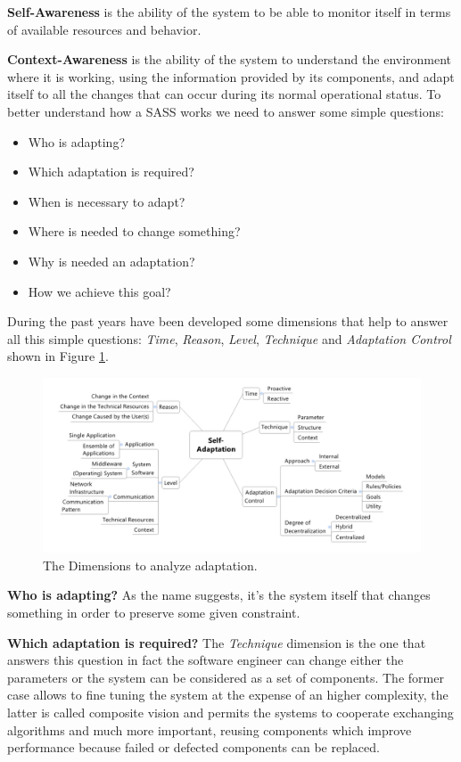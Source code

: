 \textbf{Self-Awareness} is the ability of the system to be able to monitor itself in terms of available resources and behavior.

\textbf{Context-Awareness} is the ability of the system to understand the environment where it is working, using the information provided by its components, and adapt itself to all the changes that can occur during its normal operational status.
To better understand how a SASS works we need to answer some simple questions:
\begin{itemize}
	\item Who is adapting?
	\item Which adaptation is required?
	\item When is necessary to adapt?
	\item Where is needed to change something?
	\item Why is needed an adaptation?
	\item How we achieve this goal?
\end{itemize}

During the past years have been developed some dimensions that help to answer all this simple questions: \emph{Time}, \emph{Reason}, \emph{Level}, \emph{Technique} and \emph{Adaptation Control} shown in Figure \ref{fig:dimensions}.
\begin{figure}[ht]
	\centerline
	{\includegraphics[scale=0.50]{img/dimensions.png}}
	\caption[The Dimensions]{The Dimensions to analyze adaptation.\cite{eng-appr-sas}}
	\label{fig:dimensions}
\end{figure}

\textbf{Who is adapting?} As the name suggests, it's the system itself that changes something in order to preserve some given constraint.

\textbf{Which adaptation is required?} The \emph{Technique} dimension is the one that answers this question in fact the software engineer can change either the parameters or the system can be considered as a set of components. The former case allows to fine tuning the system at the expense of an higher complexity, the latter is called composite vision and permits the systems to cooperate exchanging algorithms and much more important, reusing components which improve performance because failed or defected components can be replaced.

